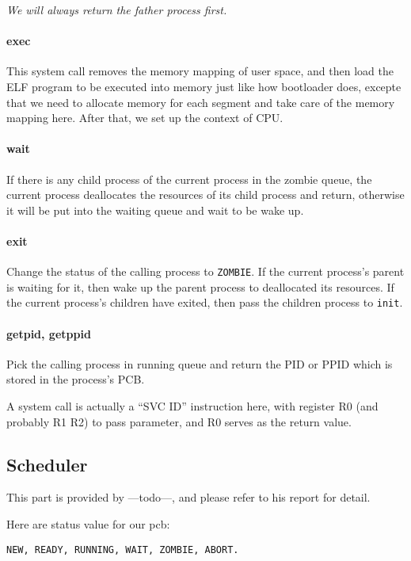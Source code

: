 \documentclass[12pt]{article}
\begin{document}
\emph{We will always return the father process first.}

\paragraph{exec}
This system call removes the memory mapping of user space, and then load the ELF program to be executed into memory just like how bootloader does, excepte that we need to allocate memory for each segment and take care of the memory mapping here. After that, we set up the context of CPU.

\paragraph{wait}
If there is any child process of the current process in the zombie queue, the current process deallocates the resources of its child process and return, otherwise it will be put into the waiting queue and wait to be wake up.

\paragraph{exit}
Change the status of the calling process to \verb|ZOMBIE|. If the current process's parent is waiting for it, then wake up the parent process to deallocated its resources. If the current process's children have exited, then pass the children process to \verb|init|.

\paragraph{getpid, getppid}
Pick the calling process in running queue and return the PID or PPID which is stored in the process's PCB.



A system call is actually a ``SVC ID'' instruction here, with register R0 (and probably R1 R2) to pass parameter, and R0 serves as the return value.

\subsection{Scheduler}
This part is provided by ---todo---, and please refer to his report for detail.

Here are status value for our pcb:

\begin{verbatim}
NEW, READY, RUNNING, WAIT, ZOMBIE, ABORT.
\end{verbatim}
\end{document}
